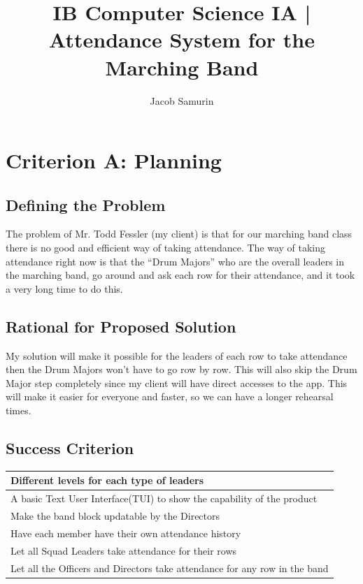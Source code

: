 \documentclass{article}
\title{IB Computer Science IA | Attendance System for the Marching Band}
\author{Jacob Samurin}
\begin{document}
\section{Criterion A: Planning}
\subsection{Defining the Problem}
The problem of Mr. Todd Fessler (my client) is that for our marching band class there is no good and efficient way of taking attendance. The way of taking attendance right now is that the “Drum Majors” who are the overall leaders in the marching band, go around and ask each row for their attendance, and it took a very long time to do this.
\subsection{Rational for Proposed Solution}
My solution will make it possible for the leaders of each row to take attendance then the Drum Majors won’t have to go row by row. This will also skip the Drum Major step completely since my client will have direct accesses to the app. This will make it easier for everyone and faster, so we can have a longer rehearsal times.
\subsection{Success Criterion}
\begin{center}
	\begin{tabular}{|l|}
		\hline
		 Different levels for each type of leaders\\
		\hline
		A basic Text User Interface(TUI) to show the capability of the product\\
		\hline
		Make the band block updatable by the Directors\\
		\hline
		Have each member have their own attendance history\\
		\hline
		Let all Squad Leaders take attendance for their rows\\
		\hline
		Let all the Officers and Directors take attendance for any row in the band\\
		\hline
	\end{tabular}
\end{center}
\newpage
\end{document}
